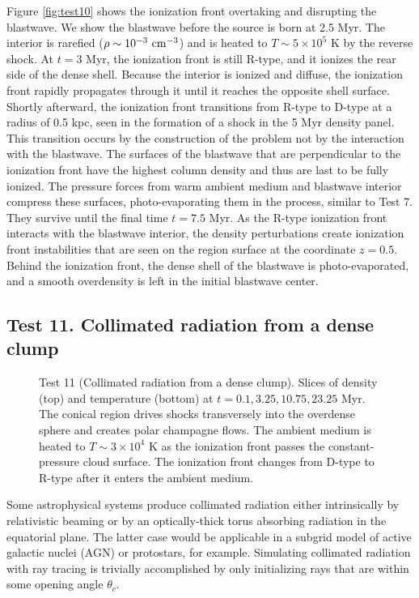 \documentclass[useAMS,usenatbib]{mn2e}
\begin{document}
Figure \ref{fig:test10} shows the ionization front overtaking and
disrupting the blastwave.  We show the blastwave before the source is
born at 2.5 Myr.  The interior is rarefied ($\rho \sim
10^{-3}~\cubecm$) and is heated to $T \sim 5 \times 10^5$ K by the
reverse shock.  At $t = 3$ Myr, the ionization front is still R-type,
and it ionizes the rear side of the dense shell.  Because the interior
is ionized and diffuse, the ionization front rapidly propagates
through it until it reaches the opposite shell surface.  Shortly
afterward, the ionization front transitions from R-type to D-type at a
radius of 0.5 kpc, seen in the formation of a shock in the 5 Myr
density panel.  This transition occurs by the construction of the
problem not by the interaction with the blastwave.  The surfaces of
the blastwave that are perpendicular to the ionization front have the
highest column density and thus are last to be fully ionized.  The
pressure forces from warm ambient medium and blastwave interior
compress these surfaces, photo-evaporating them in the process,
similar to Test 7.  They survive until the final time $t = 7.5$ Myr.
As the R-type ionization front interacts with the blastwave interior,
the density perturbations create ionization front instabilities
\citep{Whalen08_Instab} that are seen on the \hii region surface
at the coordinate $z=0.5$.  Behind the ionization front, the dense
shell of the blastwave is photo-evaporated, and a smooth overdensity
is left in the initial blastwave center.

\subsection{Test 11. Collimated radiation from a dense clump}

\begin{figure*}
  \caption{\label{fig:test11} Test 11 (Collimated radiation from a
    dense clump).  Slices of density (top) and temperature (bottom) at
    $t = 0.1, 3.25, 10.75, 23.25$ Myr.  The conical \hii region
    drives shocks transversely into the overdense sphere and creates
    polar champagne flows.  The ambient medium is heated to $T \sim 3
    \times 10^4$ K as the ionization front passes the
    constant-pressure cloud surface.  The ionization front changes
    from D-type to R-type after it enters the ambient medium.}
\end{figure*}

Some astrophysical systems produce collimated radiation either
intrinsically by relativistic beaming or by an optically-thick torus
absorbing radiation in the equatorial plane.  The latter case would be
applicable in a subgrid model of active galactic nuclei (AGN) or
protostars, for example.  Simulating collimated radiation with ray
tracing is trivially accomplished by only initializing rays that are
within some opening angle $\theta_c$.
\end{document}
